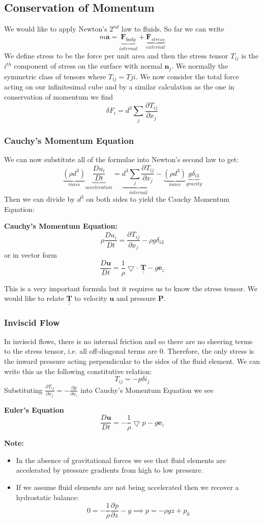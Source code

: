 \documentclass[11pt]{article}
\newcommand*{\pd}[3][]{\ensuremath{\frac{\partial^{#1} {#2}}{\partial {#3}^{#1}}}}
\newcommand*{\md}[1]{\ensuremath{\frac{D #1}{D t}}}
\newcommand{\grad}{\bigtriangledown}
\newcommand{\tul}[1]{\underline{\underline{#1}}}
\newcommand{\mv}[1]{\textbf{#1}}
\newcommand{\mdf}[1]{{\color{red}#1}}
\newenvironment{note}
    {\textbf{Note:}\begin{mdframed}[backgroundcolor=white, roundcorner=5pt, linewidth=0pt]}
    {\end{mdframed}}
\newenvironment{formula}
	{\begin{mdframed}[backgroundcolor=white, roundcorner=5pt, linewidth=1pt, linecolor=red]}
	{\end{mdframed}}
\begin{document}
\subsection{Conservation of Momentum}
We would like to apply Newton's $2^{nd}$ law to fluids. So far we can write
$$m\mv{a}=\underbrace{ \mv{F}_{body} }_{internal}+\underbrace{\mv{F}_{stress}}_{external}$$
We define \mdf{stress} to be the force per unit area and then the \mdf{stress tensor} $T_{ij}$  is the $i^{th}$ component of stress on the surface with normal $\mv{n}_j$.
We normally the symmetric class of tensors where $T_{ij}=T{ji}$.
We now consider the total force acting on our infinitesimal cube and by a similar calculation as the one in conservation of momentum we find
$$\delta F_i=d^3\sum_j\pd{T_{ij}}{x_j}$$
\subsubsection{Cauchy's Momentum Equation}
We can now substitute all of the formulae into Newton's second law to get:
$$\underbrace{ (\rho d^3) }_{mass}\underbrace{ \md{u_i} }_{acceleration}=\underbrace{d^3\sum_j\pd{T_{ij}}{x_j}}_{internal} -\underbrace{(\rho d^3)}_{mass}\underbrace{g\delta_{i3}}_{gravity}$$
Then we can divide by $d^3$ on both sides to yield the Cauchy Momentum Equation:
\begin{formula}
\textbf{Cauchy's Momentum Equation:}
$$\rho\md{u_i}=\pd{T_{ij}}{x_j}-\rho g \delta_{i3}$$
or in vector form
$$\md{\mv{u}}=\frac{1}{\rho}\grad\cdot\;\tul{\mv{T}}-g\mv{e}_z$$
\end{formula}
This is a very important formula but it requires us to know the stress tensor. We would like to relate $\tul{\mv{T}}$ to velocity $\mv{u}$ and pressure $\mv{P}$. 
\subsubsection{Inviscid Flow}
In inviscid flows, there is no internal friction and so there are no sheering terms to the stress tensor, i.e. all off-diagonal terms are 0.
Therefore, the only stress is the inward pressure acting perpendicular to the sides of the fluid element.
We can write this as the following \mdf{constitutive relation}:
$$T_{ij}=-p\delta{i_j}$$
Substituting $\pd{T_{ij}}{x_j}=-\pd{p}{x_i}$ into Cauchy's Momentum Equation we see
\begin{formula}
	\textbf{Euler's Equation}
	$$\md{\mv{u}}=-\frac{1}{\rho}\grad{p}-g\mv{e}_z$$
\end{formula}
\begin{note}
\begin{itemize}
	\item In the absence of gravitational forces we see that fluid elements are accelerated by pressure gradients from high to low pressure.
	\item If we assume fluid elements are not being accelerated then we recover a hydrostatic balance:
		$$0=-\frac{1}{\rho}\pd{p}{z}-g\implies p=-\rho gz + p_0$$
\end{itemize}
\end{note}
\end{document}
